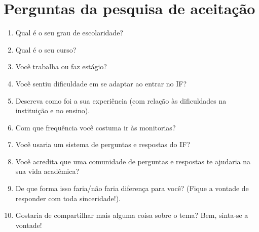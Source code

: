 \chapter{Perguntas da pesquisa de aceitação}
\label{questões}

\begin{enumerate}
  \item Qual é o seu grau de escolaridade?
  \item Qual é o seu curso?
  \item Você trabalha ou faz estágio?
  \item Você sentiu dificuldade em se adaptar ao entrar no IF?
  \item Descreva como foi a sua experiência (com relação às dificuldades na instituição e no ensino).
  \item Com que frequência você costuma ir às monitorias?
  \item Você usaria um sistema de perguntas e respostas do IF?
  \item Você acredita que uma comunidade de perguntas e respostas te ajudaria na sua vida acadêmica?
  \item De que forma isso faria/não faria diferença para você? (Fique a vontade de responder com toda sinceridade!).
  \item Gostaria de compartilhar mais alguma coisa sobre o tema? Bem, sinta-se a vontade!
\end{enumerate}